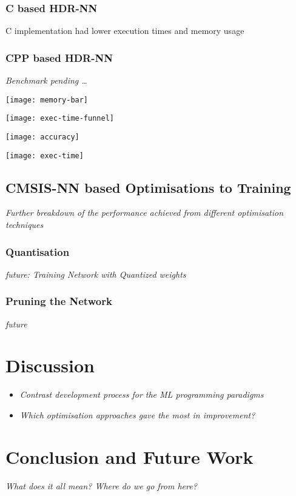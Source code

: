 \subsection[C]{C based HDR-NN}

C implementation had lower execution times and memory usage

\subsection[CPP - Eigen]{CPP based HDR-NN}
\textit{Benchmark pending \dots}

\texttt{[image: memory-bar]}

\texttt{[image: exec-time-funnel]}

\texttt{[image: accuracy]}

\texttt{[image: exec-time]}

\section{CMSIS-NN based Optimisations to Training}
\textit{Further breakdown of the performance achieved from different optimisation techniques}

\subsection{Quantisation}
\textit{future: Training Network with Quantized weights}

\subsection{Pruning the Network}
\textit{future}

\chapter{Discussion}
\begin{itemize}
	\item \textit{Contrast development process for the ML programming paradigms}
	\item \textit{Which optimisation approaches gave the most in improvement?}
\end{itemize}

\chapter{Conclusion and Future Work}
\textit{What does it all mean? Where do we go from here?}
